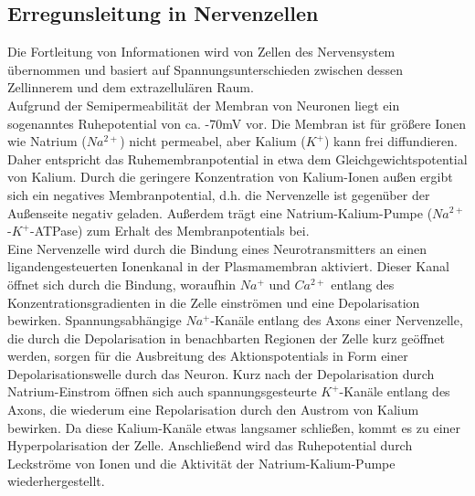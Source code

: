 \documentclass[11pt]{article}
\begin{document}
\subsection{Erregunsleitung in Nervenzellen}
Die Fortleitung von Informationen wird von Zellen des Nervensystem übernommen und basiert auf Spannungsunterschieden zwischen dessen Zellinnerem und dem extrazellulären Raum. \\
Aufgrund der Semipermeabilität der Membran von Neuronen liegt ein sogenanntes Ruhepotential von ca. -70mV vor. Die Membran ist für größere Ionen wie Natrium ($Na^{2+}$) nicht permeabel, aber Kalium ($K^{+}$) kann frei diffundieren. Daher entspricht das Ruhemembranpotential in etwa dem Gleichgewichtspotential von Kalium. Durch die geringere Konzentration von Kalium-Ionen außen ergibt sich ein negatives Membranpotential, d.h. die Nervenzelle ist gegenüber der Außenseite negativ geladen. Außerdem trägt eine Natrium-Kalium-Pumpe ($Na^{2+}$-$K^+$-ATPase) zum Erhalt des Membranpotentials bei.  \\
Eine Nervenzelle wird durch die Bindung eines Neurotransmitters an einen ligandengesteuerten Ionenkanal in der Plasmamembran aktiviert. Dieser Kanal öffnet sich durch die Bindung, woraufhin $Na^{+}$ und $Ca^{2+}$ entlang des Konzentrationsgradienten in die Zelle einströmen und eine Depolarisation bewirken. Spannungsabhängige $Na^{+}$-Kanäle entlang des Axons einer Nervenzelle, die durch die Depolarisation in benachbarten Regionen der Zelle kurz geöffnet werden, sorgen für die Ausbreitung des Aktionspotentials in Form einer Depolarisationswelle durch das Neuron. Kurz nach der Depolarisation durch Natrium-Einstrom öffnen sich auch spannungsgesteurte $K^+$-Kanäle entlang des Axons, die wiederum eine Repolarisation durch den Austrom von Kalium bewirken. Da diese Kalium-Kanäle etwas langsamer schließen, kommt es zu einer Hyperpolarisation der Zelle. Anschließend wird das Ruhepotential durch Leckströme von Ionen und die Aktivität der Natrium-Kalium-Pumpe wiederhergestellt.  \cite{lehninger}
\end{document}
